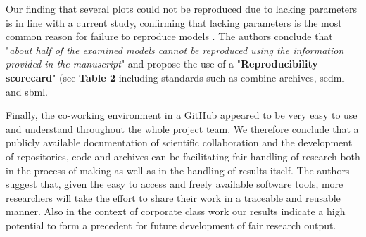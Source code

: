 Our finding that several plots could not be reproduced due to lacking parameters is in line with a current study, confirming that lacking parameters is the most common reason for failure to reproduce models \cite{tiwari2021reproducibility}. The authors conclude that "\textit{about half of the examined models cannot be reproduced using the information provided in the manuscript}" \cite{tiwari2021reproducibility} and propose the use of a "\textbf{Reproducibility scorecard}" (see \textbf{Table 2} including standards such as \ac{combine} archives, \ac{sedml} and \ac{sbml}.

Finally, the co-working environment in a GitHub appeared to be very easy to use and understand throughout the whole project team. We therefore conclude that a publicly available documentation of scientific collaboration and the development of repositories, code and archives can be facilitating \ac{fair} handling of research both in the process of making as well as in the handling of results itself.
The authors suggest that, given the easy to access and freely available software tools, more researchers will take the effort to share their work in a traceable and reusable manner. Also in the context of corporate class work our results indicate a high potential to form a precedent for future development of \ac{fair} research output.

\pagebreak

